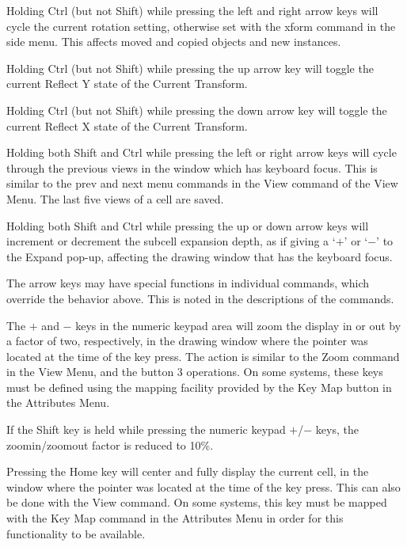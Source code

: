 Holding {\kb Ctrl} (but not {\kb Shift}) while pressing the left and
right arrow keys will cycle the current rotation setting, otherwise
set with the {\cb xform} command in the side menu.  This affects moved
and copied objects and new instances.

Holding {\kb Ctrl} (but not {\kb Shift}) while pressing the up arrow
key will toggle the current {\cb Reflect Y} state of the {\cb Current
Transform}.

Holding {\kb Ctrl} (but not {\kb Shift}) while pressing the down arrow
key will toggle the current {\cb Reflect X} state of the {\cb Current
Transform}.

Holding both {\kb Shift} and {\kb Ctrl} while pressing the left or
right arrow keys will cycle through the previous views in the window
which has keyboard focus.  This is similar to the {\cb prev} and {\cb
next} menu commands in the {\cb View} command of the {\cb View Menu}. 
The last five views of a cell are saved.

Holding both {\kb Shift} and {\kb Ctrl} while pressing the up or down
arrow keys will increment or decrement the subcell expansion depth, as
if giving a `$+$' or `$-$' to the {\cb Expand} pop-up, affecting the
drawing window that has the keyboard focus.

The arrow keys may have special functions in individual commands,
which override the behavior above.  This is noted in the descriptions
of the commands.

The {\kb $+$} and {\kb $-$} keys in the numeric keypad area will zoom
the display in or out by a factor of two, respectively, in the drawing
window where the pointer was located at the time of the key press. 
The action is similar to the {\cb Zoom} command in the {\cb View
Menu}, and the button 3 operations.  On some systems, these keys must
be defined using the mapping facility provided by the {\cb Key Map}
button in the {\cb Attributes Menu}.

If the {\kb Shift} key is held while pressing the numeric keypad {\kb
$+$}/{\kb $-$} keys, the zoomin/zoomout factor is reduced to 10\%.

Pressing the {\kb Home} key will center and fully display the current
cell, in the window where the pointer was located at the time of the
key press.  This can also be done with the {\cb View} command.  On
some systems, this key must be mapped with the {\cb Key Map} command
in the {\cb Attributes Menu} in order for this functionality to be
available.

